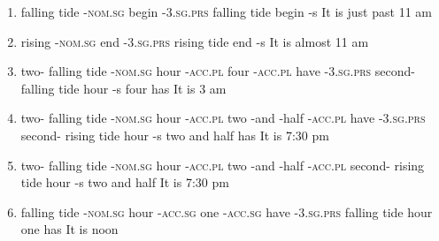 \documentclass{article}
\begin{document}
\begin{enumerate}
	\item 
		{{falling tide} -\textsc{nom.sg} begin -\textsc{3.sg.prs} }
		{{falling tide} {} begin -s }
            	{It is just past 11 am}
            
    \item 
		{{rising} -\textsc{nom.sg} end -\textsc{3.sg.prs} }
		{{rising tide} {} end -s }
		{It is almost 11 am}
            
    \item 
		{two- {falling tide} -\textsc{nom.sg} hour -\textsc{acc.pl} four -\textsc{acc.pl}  have -\textsc{3.sg.prs} }
		{second- {falling tide} {} hour -s four {} has {} }
		{It is 3 am}

    \item 
		{two- {falling tide} -\textsc{nom.sg} hour -\textsc{acc.pl} two -and -half -\textsc{acc.pl}  have -\textsc{3.sg.prs} }
		{second- {rising tide} {} hour -s two and half {} has {} }
		{It is 7:30 pm}

    \item 
		{two- {falling tide} -\textsc{nom.sg} hour -\textsc{acc.pl} two -and -half -\textsc{acc.pl} }
		{second- {rising tide} {} hour -s two and half {} }
		{It is 7:30 pm}
            

    \item 
		{{falling tide} -\textsc{nom.sg} hour -\textsc{acc.sg} one -\textsc{acc.sg} have -\textsc{3.sg.prs}}
		{{falling tide} {} hour {} one {} has {} }
		{It is noon}
		

\end{enumerate}
\end{document}
